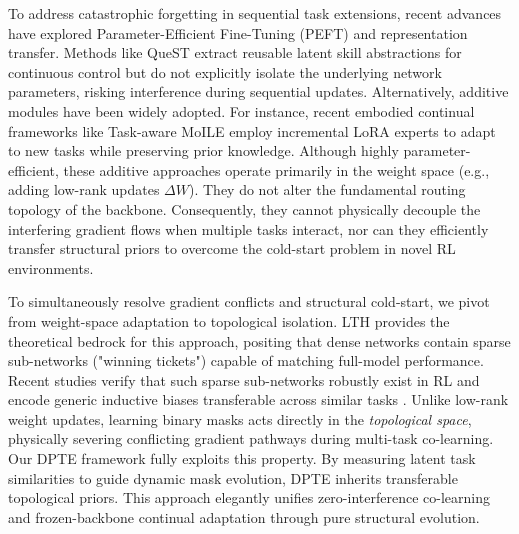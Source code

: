 \documentclass{article}
\begin{document}
To address catastrophic forgetting in sequential task extensions, recent advances have explored Parameter-Efficient Fine-Tuning (PEFT) and representation transfer. 
Methods like QueST \cite{n4} extract reusable latent skill abstractions for continuous control but do not explicitly isolate the underlying network parameters, risking interference during sequential updates. 
Alternatively, additive modules have been widely adopted. 
For instance, recent embodied continual frameworks like Task-aware MoILE \cite{n5} employ incremental LoRA experts to adapt to new tasks while preserving prior knowledge. 
Although highly parameter-efficient, these additive approaches operate primarily in the weight space (e.g., adding low-rank updates $\Delta W$). 
They do not alter the fundamental routing topology of the backbone. Consequently, they cannot physically decouple the interfering gradient flows when multiple tasks interact, nor can they efficiently transfer structural priors to overcome the cold-start problem in novel RL environments.



To simultaneously resolve gradient conflicts and structural cold-start, we pivot from weight-space adaptation to topological isolation. 
LTH \cite{n1} provides the theoretical bedrock for this approach, positing that dense networks contain sparse sub-networks ("winning tickets") capable of matching full-model performance. 
Recent studies verify that such sparse sub-networks robustly exist in RL \cite{n2} and encode generic inductive biases transferable across similar tasks \cite{n3}. 
Unlike low-rank weight updates, learning binary masks acts directly in the \emph{topological space}, physically severing conflicting gradient pathways during multi-task co-learning. 
Our DPTE framework fully exploits this property. By measuring latent task similarities to guide dynamic mask evolution, DPTE inherits transferable topological priors. 
This approach elegantly unifies zero-interference co-learning and frozen-backbone continual adaptation through pure structural evolution.
\end{document}
